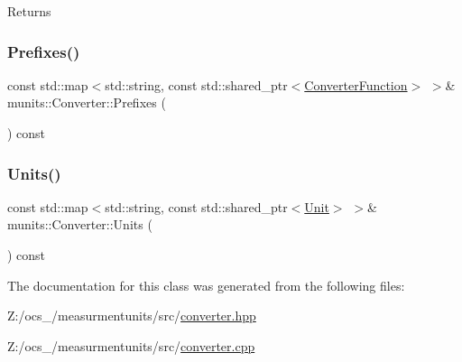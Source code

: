 \begin{DoxyReturn}{Returns}

\end{DoxyReturn}
\mbox{\label{classmunits_1_1_converter_a48a8ab27724c3aa86e9f36bc8699ae22}} 
\subsubsection{\texorpdfstring{Prefixes()}{Prefixes()}}
{\footnotesize\ttfamily const std\+::map$<$std\+::string, const std\+::shared\+\_\+ptr$<$\hyperlink{classmunits_1_1_converter_function}{Converter\+Function}$>$ $>$\& munits\+::\+Converter\+::\+Prefixes (\begin{DoxyParamCaption}{ }\end{DoxyParamCaption}) const\hspace{0.3cm}{\ttfamily [inline]}}

\mbox{\label{classmunits_1_1_converter_aaff2382aa50e3387784e2aaba90ba4ae}} 
\subsubsection{\texorpdfstring{Units()}{Units()}}
{\footnotesize\ttfamily const std\+::map$<$std\+::string, const std\+::shared\+\_\+ptr$<$\hyperlink{classmunits_1_1_unit}{Unit}$>$ $>$\& munits\+::\+Converter\+::\+Units (\begin{DoxyParamCaption}{ }\end{DoxyParamCaption}) const\hspace{0.3cm}{\ttfamily [inline]}}



The documentation for this class was generated from the following files\+:\begin{DoxyCompactItemize}
\item 
Z\+:/ocs\+\_/measurmentunits/src/\hyperlink{converter_8hpp}{converter.\+hpp}\item 
Z\+:/ocs\+\_/measurmentunits/src/\hyperlink{converter_8cpp}{converter.\+cpp}\end{DoxyCompactItemize}
